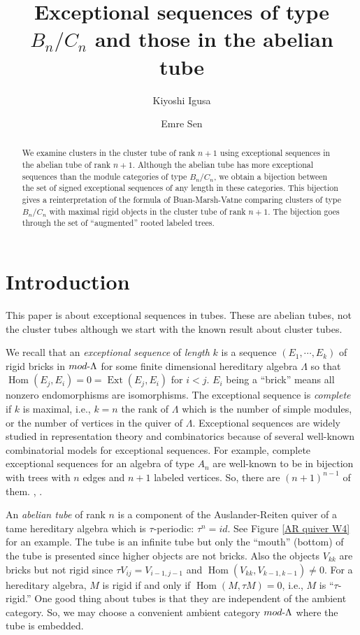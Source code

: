 \documentclass[11pt]{amsart}
\title{Exceptional sequences of type $B_n/C_n$ and those in the abelian tube}
\author{Kiyoshi Igusa}
\author{Emre Sen}
\theoremstyle{definition}
\theoremstyle{remark}
\numberwithin{equation}{section}
\DeclareMathOperator{\Hom}{Hom}%
\DeclareMathOperator{\Ext}{Ext}%
\begin{document}
\begin{abstract} We examine clusters in the cluster tube of rank $n+1$ using exceptional sequences in the abelian tube of rank $n+1$. Although the abelian tube has more exceptional sequences than the module categories of type $B_{n}/C_{n}$, we obtain a bijection between the set of signed exceptional sequences of any length in these categories. This bijection gives a reinterpretation of the formula of Buan-Marsh-Vatne comparing clusters of type $B_n/C_n$ with maximal rigid objects in the cluster tube of rank $n+1$. The bijection goes through the set of ``augmented'' rooted labeled trees.
\end{abstract}

\maketitle




\section*{Introduction}


This paper is about exceptional sequences in tubes. These are abelian tubes, not the cluster tubes although we start with the known result about cluster tubes.

{
We recall that an \emph{exceptional sequence} of \emph{length} $k$ is a sequence $(E_1,\cdots,E_k)$ of rigid bricks in $mod\text-\Lambda$ for some finite dimensional hereditary algebra $\Lambda$ so that $\Hom(E_j,E_i)=0=\Ext(E_j,E_i)$ for $i<j$. $E_i$ being a ``brick'' means all nonzero endomorphisms are isomorphisms. The exceptional sequence is \emph{complete} if $k$ is maximal, i.e., $k=n$ the rank of $\Lambda$ which is the number of simple modules, or the number of vertices in the quiver of $\Lambda$. Exceptional sequences are widely studied in representation theory and combinatorics because of several well-known combinatorial models for exceptional sequences. For example, complete exceptional sequences for an algebra of type $A_n$ are well-known to be in bijection with trees with $n$ edges and $n+1$ labeled vertices. So, there are $(n+1)^{n-1}$ of them. \cite{Ig-Sen}, \cite{GIMO}.

An \emph{abelian tube} of rank $n$ is a component of the Auslander-Reiten quiver of a tame hereditary algebra which is $\tau$-periodic: $\tau^n=id$. See Figure \ref{AR quiver W4} for an example. The tube is an infinite tube but only the ``mouth'' (bottom) of the tube is presented since higher objects are not bricks. Also the objects $V_{kk}$ are bricks but not rigid since $\tau V_{ij}=V_{i-1,j-1}$ and $\Hom(V_{kk},V_{k-1,k-1})\neq0$. For a hereditary algebra, $M$ is rigid if and only if $\Hom(M,\tau M)=0$, i.e., $M$ is ``$\tau$-rigid.'' One good thing about tubes is that they are independent of the ambient category. So, we may choose a convenient ambient category $mod\text-\Lambda$ where the tube is embedded.
}
\end{document}
